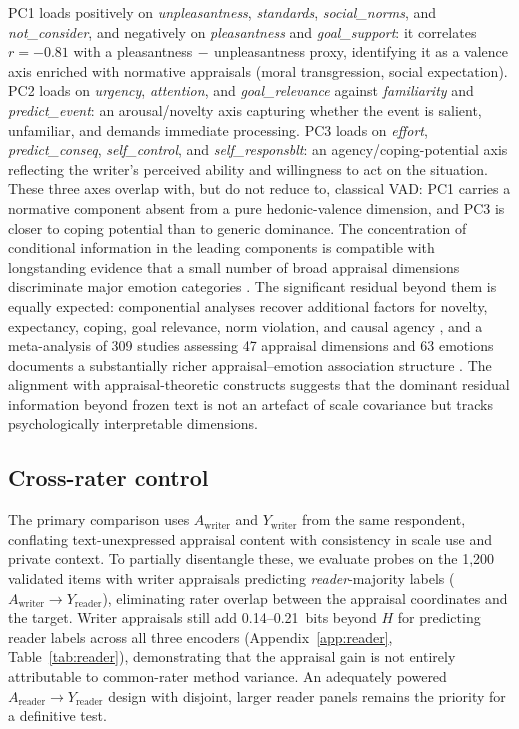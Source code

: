 \documentclass[11pt]{article}
\begin{document}
PC1 loads positively on \emph{unpleasantness}, \emph{standards}, \emph{social\_norms}, and \emph{not\_consider}, and negatively on \emph{pleasantness} and \emph{goal\_support}: it correlates $r=-0.81$ with a pleasantness$\,-\,$unpleasantness proxy, identifying it as a valence axis enriched with normative appraisals (moral transgression, social expectation).
PC2 loads on \emph{urgency}, \emph{attention}, and \emph{goal\_relevance} against \emph{familiarity} and \emph{predict\_event}: an arousal/novelty axis capturing whether the event is salient, unfamiliar, and demands immediate processing.
PC3 loads on \emph{effort}, \emph{predict\_conseq}, \emph{self\_control}, and \emph{self\_responsblt}: an agency/coping-potential axis reflecting the writer's perceived ability and willingness to act on the situation.
These three axes overlap with, but do not reduce to, classical VAD: PC1 carries a normative component absent from a pure hedonic-valence dimension, and PC3 is closer to coping potential than to generic dominance.
The concentration of conditional information in the leading components is compatible with longstanding evidence that a small number of broad appraisal dimensions discriminate major emotion categories \citep{scherer1997profiles,fontaine-etal-2007-two-dimensional}.
The significant residual beyond them is equally expected: componential analyses recover additional factors for novelty, expectancy, coping, goal relevance, norm violation, and causal agency \citep{fontaine-scherer-2013}, and a meta-analysis of 309 studies assessing 47 appraisal dimensions and 63 emotions documents a substantially richer appraisal--emotion association structure \citep{yeo-ong-2024}.
The alignment with appraisal-theoretic constructs suggests that the dominant residual information beyond frozen text is not an artefact of scale covariance but tracks psychologically interpretable dimensions.

\subsection{Cross-rater control}
\label{sec:crossrater}

The primary comparison uses $A_{\mathrm{writer}}$ and $Y_{\mathrm{writer}}$ from the same respondent, conflating text-unexpressed appraisal content with consistency in scale use and private context. To partially disentangle these, we evaluate probes on the 1{,}200 validated items with writer appraisals predicting \emph{reader}-majority labels ($A_{\mathrm{writer}}\!\rightarrow\!Y_{\mathrm{reader}}$), eliminating rater overlap between the appraisal coordinates and the target. Writer appraisals still add 0.14--0.21~bits beyond $H$ for predicting reader labels across all three encoders (Appendix~\ref{app:reader}, Table~\ref{tab:reader}), demonstrating that the appraisal gain is not entirely attributable to common-rater method variance. An adequately powered $A_{\mathrm{reader}}\!\to\!Y_{\mathrm{reader}}$ design with disjoint, larger reader panels remains the priority for a definitive test.
\end{document}
